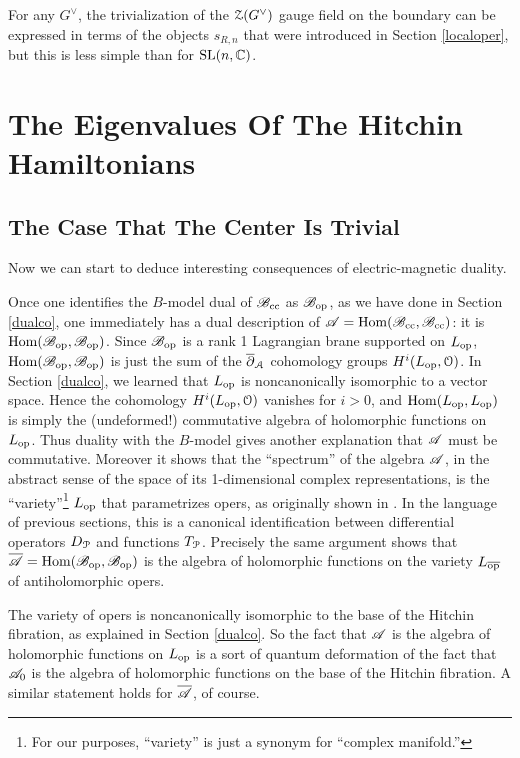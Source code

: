 \documentclass[11pt,a4paper]{article}
\begin{document}
 
 For any $G^\vee$,  the trivialization of the $\zZ(G^\vee)$ gauge field on the boundary can be expressed in terms of the objects $s_{R,n}$ that were introduced
 in Section \ref{localoper}, but this is less simple than for $\SL(n,\C)$.
 

 



  \section{The Eigenvalues Of The Hitchin Hamiltonians}\label{hitchval} 

\subsection{The Case That The Center Is Trivial}\label{centertriv}

Now we can start to deduce interesting consequences of electric-magnetic duality.

Once one identifies the $B$-model dual of $\B_\cc$ as $\B_\op$, 
as we have done in Section \ref{dualco}, one immediately has a dual description of $\A=\Hom(\B_\cc,\B_\cc)$:
it is  $\Hom(\B_\op,\B_\op)$.    Since $\B_\op$ is a rank 1 Lagrangian brane supported on $L_\op$, $\Hom(\B_\op,\B_\op)$ is just the sum of the $\bar\partial_\cA$ cohomology groups $H^i(L_\op, \O)$.    
In Section \ref{dualco}, we learned that $L_\op$ is noncanonically
 isomorphic to a vector space.   Hence the cohomology $H^i(L_\op,\O)$ vanishes for $i>0$, and $\Hom(L_\op,L_\op)$
is simply the (undeformed!) commutative algebra of holomorphic functions on $L_\op$.    Thus duality with the $B$-model
 gives another explanation that $\A$ must be commutative.
Moreover it shows that the ``spectrum'' of the algebra $\A$, in the abstract sense of the space of its 1-dimensional complex representations, is the 
``variety''\footnote{For our purposes, ``variety'' is just a synonym for ``complex manifold.''} $L_\op$ that parametrizes opers,   as originally shown in \cite{BD}. In the language of previous sections, this is a canonical identification between differential operators $\D_\P$ and functions $T_\P$.  
   Precisely the same argument shows that $\b\A=\Hom(\B_\op,\B_\op)$ is the algebra of holomorphic functions on the variety $L_\bop$
of antiholomorphic opers.  

The variety of opers is noncanonically isomorphic to the base of the Hitchin fibration, as explained in Section \ref{dualco}.
  So the fact that $\A$ is the algebra of holomorphic functions on $L_\op$ is a sort of quantum deformation of the
fact that $\A_0$ is the algebra of holomorphic functions on the base of the Hitchin fibration.   A similar statement holds for $\b\A$, of course.
\end{document}
